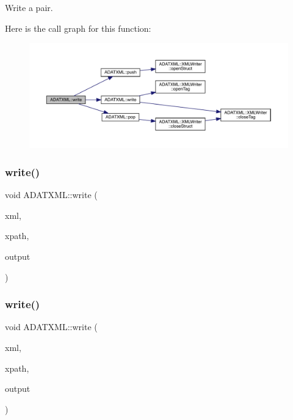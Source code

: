 Write a pair. 

Here is the call graph for this function\+:\nopagebreak
\begin{figure}[H]
\begin{center}
\leavevmode
\includegraphics[width=350pt]{d2/da3/group__io_gabcda0d5bebd682903ae663861766df8b_cgraph}
\end{center}
\end{figure}
\mbox{\label{group__io_ga5f73c76144fce7c12dd53d0f785b2d05}} 
\subsubsection{\texorpdfstring{write()}{write()}\hspace{0.1cm}{\footnotesize\ttfamily [32/58]}}
{\footnotesize\ttfamily void A\+D\+A\+T\+X\+M\+L\+::write (\begin{DoxyParamCaption}\item[{\mbox{\hyperlink{classADATXML_1_1XMLWriter}{X\+M\+L\+Writer}} \&}]{xml,  }\item[{const std\+::string \&}]{xpath,  }\item[{const std\+::vector$<$ int $>$ \&}]{output }\end{DoxyParamCaption})}

\mbox{\label{group__io_ga763106f559ef609d54f89243e5965af4}} 
\subsubsection{\texorpdfstring{write()}{write()}\hspace{0.1cm}{\footnotesize\ttfamily [33/58]}}
{\footnotesize\ttfamily void A\+D\+A\+T\+X\+M\+L\+::write (\begin{DoxyParamCaption}\item[{\mbox{\hyperlink{classADATXML_1_1XMLWriter}{X\+M\+L\+Writer}} \&}]{xml,  }\item[{const std\+::string \&}]{xpath,  }\item[{const std\+::vector$<$ unsigned int $>$ \&}]{output }\end{DoxyParamCaption})}

